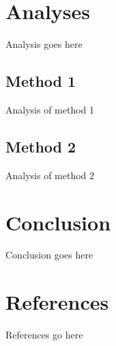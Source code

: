 \documentclass[a4paper,12pt]{article}
\begin{document}
\section{Analyses}
Analysis goes here

\subsection{Method 1}
Analysis of method 1
\subsection{Method 2}
Analysis of method 2

\section{Conclusion}
Conclusion goes here

\section{References}
References go here
\end{document}
